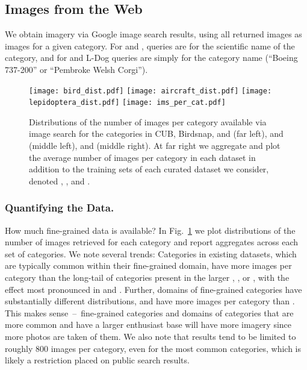 \documentclass[runningheads]{llncs}
\begin{document}
\subsection{Images from the Web}
\label{sec:data_imagery}
We obtain imagery via Google image search results, using all returned images as images for a given category.
For \lbird{} and \llep{}, queries are for the scientific name of the category, and for \lair{} and L-Dog queries are simply for the category name (\eg ``Boeing 737-200'' or ``Pembroke Welsh Corgi'').




\begin{figure}[t]
\centering
\texttt{[image: bird\_dist.pdf]}
\texttt{[image: aircraft\_dist.pdf]}
\texttt{[image: lepidoptera\_dist.pdf]}
\texttt{[image: ims\_per\_cat.pdf]}
\caption{
Distributions of the number of images per category available via image search for the categories in CUB, Birdsnap, and \lbird{} (far left), \fgvc{} and \lair{} (middle left), and \llep{} (middle right).
At far right we aggregate and plot the average number of images per category in each dataset in addition to the training sets of each curated dataset we consider, denoted \cubgt{}, \birdsnapgt{}, and \fgvcgt{}.
}
\label{fig:cat_dist}
\end{figure}

\subsubsection{Quantifying the Data.}
How much fine-grained data is available?
In Fig.~\ref{fig:cat_dist} we plot distributions of the number of images retrieved for each category and report aggregates across each set of categories.
We note several trends:
Categories in existing datasets, which are typically common within their fine-grained domain, have more images per category than the long-tail of categories present in the larger \lbird{}, \lair{}, or \llep{}, with the effect most pronounced in \lbird{} and \llep{}.
Further, domains of fine-grained categories have substantially different distributions, \ie \lbird{} and \lair{} have more images per category than \llep{}.
This makes \mbox{sense -- fine-grained} categories and domains of categories that are more common and have a larger enthusiast base will have more imagery since more photos are taken of them.
We also note that results tend to be limited to roughly 800 images per category, even for the most common categories, which is likely a restriction placed on public search results.
\end{document}
